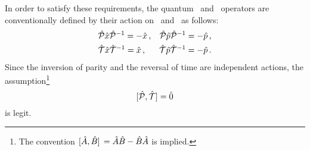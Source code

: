         In order to satisfy these requirements, the quantum \hP\ and \hT\ operators are conventionally defined by their action on \hx\ and \hp\ as follows:
        \begin{align}
            \label{eq:quantum-P}
            &\mathcal{\hat{P}}\hat{x}\mathcal{\hat{P}}^{-1} = -\hat{x}
            \,\text{,}
            &\mathcal{\hat{P}}\hat{p}\mathcal{\hat{P}}^{-1} = -\hat{p}
            \,\text{,}
            \\
            \label{eq:quantum-T}
            &\mathcal{\hat{T}}\hat{x}\mathcal{\hat{T}}^{-1} = \hat{x}
            \,\text{,}
            &\mathcal{\hat{T}}\hat{p}\mathcal{\hat{T}}^{-1} = -\hat{p}
            \,\text{.}
        \end{align}
        Since the inversion of parity and the reversal of time are independent actions, the assumption\footnote{The convention $\comm*{\hA}{\togglehat{B}} = \hA\togglehat{B} - \togglehat{B}\hA$ is implied.}
        \begin{equation}
            \label{eq:PT-commutator}
            \comm*{\hP}{\hT}\! = \hzero 
        \end{equation}
        is legit.

